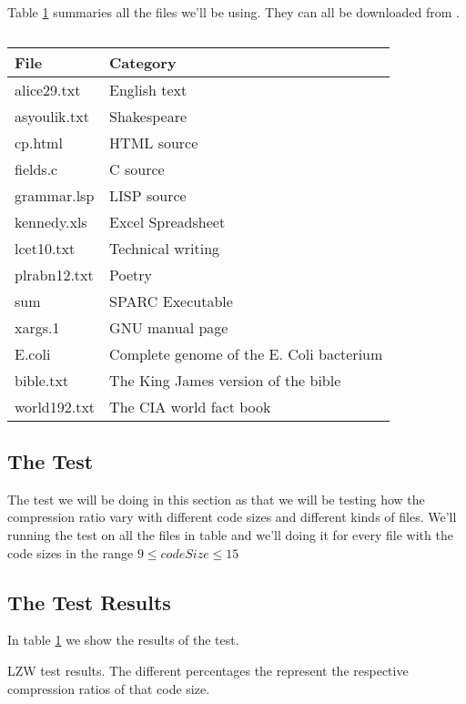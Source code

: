 \begin{refsection}
Table \ref{tab:corp-files} summaries all the files we'll be using. They can all be
downloaded from \cite{powell:desc-corp}.

\begin{table}
  \centering
  \begin{tabular}{ll}
    \toprule
    File & Category \\
    \midrule
    alice29.txt & English text \\
    asyoulik.txt & Shakespeare \\
    cp.html & HTML source \\
    fields.c & C source \\
    grammar.lsp & LISP source \\
    kennedy.xls & Excel Spreadsheet \\
    lcet10.txt & Technical writing \\
    plrabn12.txt & Poetry \\
    sum & SPARC Executable \\
    xargs.1 & GNU manual page \\
    E.coli & Complete genome of the E. Coli bacterium \\
    bible.txt & The King James version of the bible \\
    world192.txt & The CIA world fact book \\
    \bottomrule
  \end{tabular}
  \caption{}
  \label{tab:corp-files}
\end{table}

\subsection{The Test}

The test we will be doing in this section as that we will be testing
how the compression ratio vary with different code sizes and different
kinds of files. We'll running the test on all the files in table and
we'll doing it for every file with the code sizes in the range $9 \leq
codeSize \leq 15$

\subsection{The Test Results}

In table \ref{tab:corp-files} we show the results of the test.

\begin{table}
  \scriptsize
  \centering
  
  \caption{LZW test results. The different percentages the represent the respective compression ratios of that code size.}
  \label{tab:corp-files}
\end{table}


\end{refsection}
